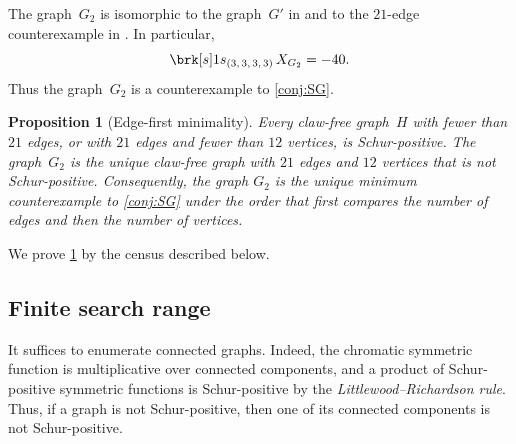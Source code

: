 \documentclass[11pt]{amsart}
\numberwithin{equation}{section}
\newtheorem{proposition}[lemma]{Proposition}
\theoremstyle{remark}
\newcommand{\CSF}{X}
\newcommand{\Gtwo}{G_{2}}
\newcommand{\coeff}[2]{\brk[s]1{s_{#1}}\,#2}
\newcommand{\graphpointsize}{1.45pt}
\newcommand{\GraphDot}[1]{\fill (#1) circle (\graphpointsize);}
\begin{document}
\begin{figure}[ht]
\begin{minipage}[b]{0.51\textwidth}
\captionsetup{font=footnotesize,justification=centering}
\captionof{figure}{The line graph~$\Gtwo=L(H_2)$.}
\label{fig:G2}
\end{minipage}
\end{figure}
The graph~$\Gtwo$ is isomorphic to the graph~$G'$ in
\citet[Proposition~4]{Prajapati2026} and to the $21$-edge
counterexample in \citet{MM2026}.  In particular,
\begin{equation}\label{eq:base-negative}
\coeff{(3,\,3,\,3,\,3)}{\CSF_{\Gtwo}}=-40.
\end{equation}
Thus the graph~$\Gtwo$ is a counterexample to \cref{conj:SG}.

\begin{proposition}[Edge-first minimality]\label{prop:edge-first-minimality}
Every claw-free graph~$H$ with fewer than $21$ edges, or with $21$ edges and
fewer than $12$ vertices, is Schur-positive.
The graph~$\Gtwo$ is the unique claw-free graph with
$21$ edges and $12$ vertices that is not Schur-positive.
Consequently, the graph $\Gtwo$ is the unique minimum counterexample to \cref{conj:SG} under the order
that first compares the number of edges and then the number of vertices.
\end{proposition}

We prove \cref{prop:edge-first-minimality} by the census described below.

\subsection{Finite search range}\label{subsec:finite-search}

It suffices to enumerate connected graphs.  Indeed, the chromatic symmetric
function is multiplicative over connected components, and a product of
Schur-positive symmetric functions is Schur-positive by the
\emph{Littlewood--Richardson rule}. Thus, if a graph is not Schur-positive, then one of its connected
components is not Schur-positive.
\end{document}
